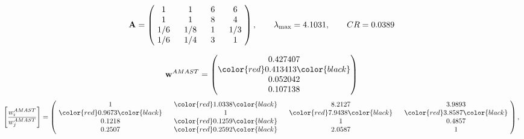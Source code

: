 \begin{example}
\begin{equation*}
\mathbf{A} =
\begin{pmatrix}
$\,\,$ 1 $\,\,$ & $\,\,$1$\,\,$ & $\,\,$6$\,\,$ & $\,\,$6 $\,\,$ \\
$\,\,$ 1 $\,\,$ & $\,\,$ 1 $\,\,$ & $\,\,$8$\,\,$ & $\,\,$4 $\,\,$ \\
$\,\,$ 1/6$\,\,$ & $\,\,$ 1/8$\,\,$ & $\,\,$ 1 $\,\,$ & $\,\,$ 1/3 $\,\,$ \\
$\,\,$ 1/6$\,\,$ & $\,\,$ 1/4$\,\,$ & $\,\,$3$\,\,$ & $\,\,$ 1  $\,\,$ \\
\end{pmatrix},
\qquad
\lambda_{\max} =
4.1031,
\qquad
CR = 0.0389
\end{equation*}

\begin{equation*}
\mathbf{w}^{AMAST} =
\begin{pmatrix}
0.427407\\
\color{red} 0.413413\color{black} \\
0.052042\\
0.107138
\end{pmatrix}\end{equation*}
\begin{equation*}
\left[ \frac{{w}^{AMAST}_i}{{w}^{AMAST}_j} \right] =
\begin{pmatrix}
$\,\,$ 1 $\,\,$ & $\,\,$\color{red} 1.0338\color{black} $\,\,$ & $\,\,$8.2127$\,\,$ & $\,\,$3.9893$\,\,$ \\
$\,\,$\color{red} 0.9673\color{black} $\,\,$ & $\,\,$ 1 $\,\,$ & $\,\,$\color{red} 7.9438\color{black} $\,\,$ & $\,\,$\color{red} 3.8587\color{black}   $\,\,$ \\
$\,\,$0.1218$\,\,$ & $\,\,$\color{red} 0.1259\color{black} $\,\,$ & $\,\,$ 1 $\,\,$ & $\,\,$0.4857 $\,\,$ \\
$\,\,$0.2507$\,\,$ & $\,\,$\color{red} 0.2592\color{black} $\,\,$ & $\,\,$2.0587$\,\,$ & $\,\,$ 1  $\,\,$ \\
\end{pmatrix},
\end{equation*}


\end{example}
